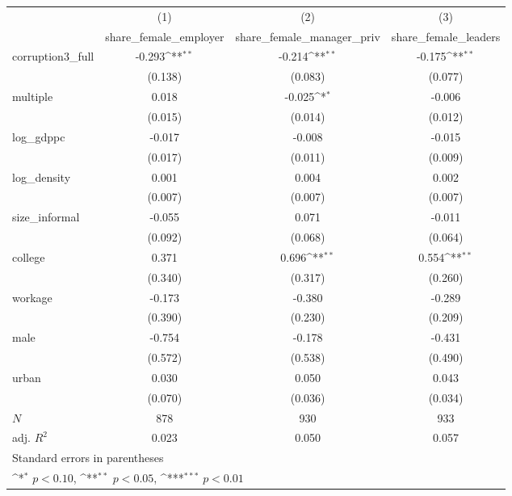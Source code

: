 {
\def\sym#1{\ifmmode^{#1}\else\(^{#1}\)\fi}
\begin{tabular}{l*{3}{c}}
\hline\hline
            &\multicolumn{1}{c}{(1)}&\multicolumn{1}{c}{(2)}&\multicolumn{1}{c}{(3)}\\
            &\multicolumn{1}{c}{share\_female\_employer}&\multicolumn{1}{c}{share\_female\_manager\_priv}&\multicolumn{1}{c}{share\_female\_leaders}\\
\hline
corruption3\_full&      -0.293\sym{**} &      -0.214\sym{**} &      -0.175\sym{**} \\
            &     (0.138)         &     (0.083)         &     (0.077)         \\
[1em]
multiple    &       0.018         &      -0.025\sym{*}  &      -0.006         \\
            &     (0.015)         &     (0.014)         &     (0.012)         \\
[1em]
log\_gdppc   &      -0.017         &      -0.008         &      -0.015         \\
            &     (0.017)         &     (0.011)         &     (0.009)         \\
[1em]
log\_density &       0.001         &       0.004         &       0.002         \\
            &     (0.007)         &     (0.007)         &     (0.007)         \\
[1em]
size\_informal&      -0.055         &       0.071         &      -0.011         \\
            &     (0.092)         &     (0.068)         &     (0.064)         \\
[1em]
college     &       0.371         &       0.696\sym{**} &       0.554\sym{**} \\
            &     (0.340)         &     (0.317)         &     (0.260)         \\
[1em]
workage     &      -0.173         &      -0.380         &      -0.289         \\
            &     (0.390)         &     (0.230)         &     (0.209)         \\
[1em]
male        &      -0.754         &      -0.178         &      -0.431         \\
            &     (0.572)         &     (0.538)         &     (0.490)         \\
[1em]
urban       &       0.030         &       0.050         &       0.043         \\
            &     (0.070)         &     (0.036)         &     (0.034)         \\
\hline
\(N\)       &         878         &         930         &         933         \\
adj. \(R^{2}\)&       0.023         &       0.050         &       0.057         \\
\hline\hline
\multicolumn{4}{l}{\footnotesize Standard errors in parentheses}\\
\multicolumn{4}{l}{\footnotesize \sym{*} \(p<0.10\), \sym{**} \(p<0.05\), \sym{***} \(p<0.01\)}\\
\end{tabular}
}
